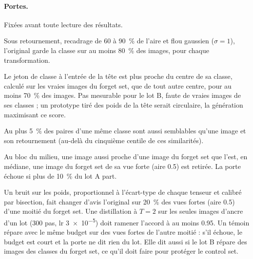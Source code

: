 \documentclass[11pt,a4paper]{article}
\begin{document}
\paragraph{Portes.} Fixées avant toute lecture des résultats.
\begin{description}[leftmargin=1.2em,font=\sffamily\bfseries\color{bleu}]
  \item[a. Robustesse] Sous retournement, recadrage de 60 à \SI{90}{\percent} de l'aire et flou
    gaussien ($\sigma=1$), l'original garde la classe sur au moins \SI{80}{\percent} des images, pour
    chaque transformation.
  \item[b. Appartenance] Le jeton de classe à l'entrée de la tête est plus proche du centre de sa
    classe, calculé sur les vraies images du forget set, que de tout autre centre, pour au moins
    \SI{70}{\percent} des images. Pas mesurable pour le lot B, faute de vraies images de ses classes ;
    un prototype tiré des poids de la tête serait circulaire, la génération maximisant ce score.
  \item[c. Variété] Au plus \SI{5}{\percent} des paires d'une même classe sont aussi semblables
    qu'une image et son retournement (au-delà du cinquième centile de ces similarités).
  \item[c'. Distance au forget set] Au bloc du milieu, une image aussi proche d'une image du forget set
    que l'est, en médiane, une image du forget set de sa vue forte (aire \num{0.5}) est retirée. La
    porte échoue si plus de \SI{10}{\percent} du lot A part.
  \item[d. Réparation] Un bruit sur les poids, proportionnel à l'écart-type de chaque tenseur et
    calibré par bisection, fait changer d'avis l'original sur \SI{20}{\percent} des vues fortes
    (aire \num{0.5}) d'une moitié du forget set. Une distillation à $T=2$ sur les seules images
    d'ancre d'un lot (300 pas, lr \num{3e-5}) doit ramener l'accord à au moins \num{0.95}. Un témoin
    répare avec le même budget sur des vues fortes de l'autre moitié : s'il échoue, le budget est
    court et la porte ne dit rien du lot. Elle dit aussi si le lot B répare des images des classes du
    forget set, ce qu'il doit faire pour protéger le control set.
\end{description}
\end{document}
